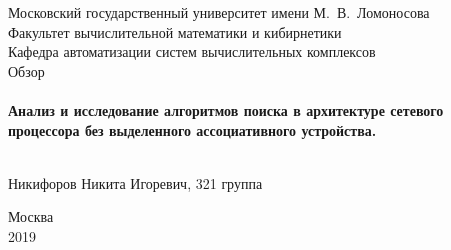 \documentclass[a4peper, 12pt, titlepage, finall]{extreport}
\begin{document}
    \begin{titlepage}
        \begin{center}
            {\small \sc Московский государственный университет имени М.~В.~Ломоносова\\
            Факультет вычислительной математики и кибирнетики\\
            Кафедра автоматизации систем вычислительных комплексов\\}
            \vfill
            {\large \sc Обзор}\\~\\

            {\large \bf Анализ и исследование алгоритмов поиска в архитектуре сетевого процессора без выделенного ассоциативного устройства.}\\~\\

        \end{center}
        
        \begin{flushright}
            \vfill
            {Никифоров Никита Игоревич, 321 группа}
        \end{flushright}

        \begin{center}
            \vfill
            {\small Москва\\2019}
        \end{center}
    \end{titlepage}

    \tableofcontents
    \listoffigures
    \newpage
\end{document}
